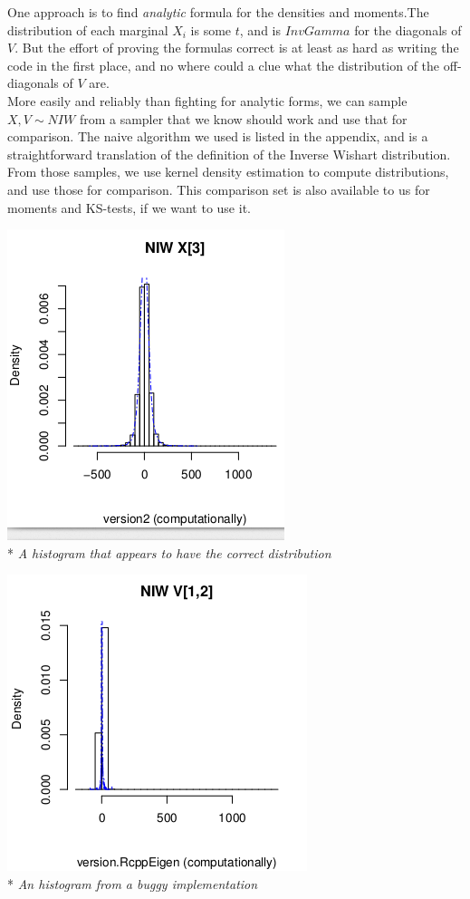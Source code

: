 \documentclass[english]{report}
\begin{document}
One approach is to find \emph{analytic} formula for the densities and moments.The distribution of each marginal $X_i$ is \cite{Bayes} some $t$, and is $InvGamma$ \cite{Wikipedia2} for the diagonals of $V$. But the effort of proving the formulas correct is at least as hard as writing the code in the first place, and no where could a clue what the distribution of the off-diagonals of $V$ are.\\

More easily and reliably than fighting for analytic forms, we can sample $X,V \sim NIW$ from a sampler that we know should work and use that for comparison.
The naive algorithm we used is listed in the appendix, and is a straightforward translation of the definition of the Inverse Wishart distribution.
From those samples, we use kernel density estimation to compute distributions, and use those for comparison. This comparison set is also available to us for moments and KS-tests, if we want to use it.

\begin{center}
\includegraphics[scale=.8]{densitycorrect.png}\\*
\emph{A histogram that appears to have the correct distribution}
\end{center}

\begin{center}
\includegraphics[scale=.8]{densityincorrect.png}\\*
\emph{An histogram from a buggy implementation}
\\  
\end{center}
\end{document}
